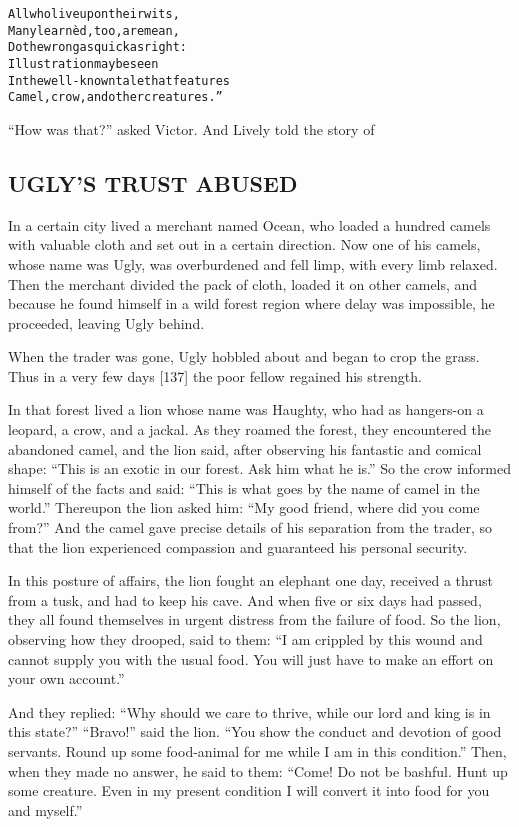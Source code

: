 \documentclass{article}
\renewenvironment{verbatim}{\begin{alltt}\normalfont\begin{centering}}{\end{centering}\end{alltt}}
\begin{document}
\begin{verbatim}
All who live upon their wits,
    Many learnèd, too, are mean,
Do the wrong as quick as right:
    Illustration may be seen
In the well-known tale that features
Camel, crow, and other creatures.”
\end{verbatim}
``How was that?'' asked Victor. And Lively told the story of

\subsection{UGLY'S TRUST ABUSED}

In a certain city lived a merchant named Ocean, who loaded a
hundred camels with valuable cloth and set out in a certain
direction. Now one of his camels, whose name was Ugly, was
overburdened and fell limp, with every limb relaxed. Then the
merchant divided the pack of cloth, loaded it on other camels, and
because he found himself in a wild forest region where delay was
impossible, he proceeded, leaving Ugly behind.

When the trader was gone, Ugly hobbled about and began to crop the
grass. Thus in a very few days [137] the poor fellow regained his
strength.

In that forest lived a lion whose name was Haughty, who had as
hangers-on a leopard, a crow, and a jackal. As they roamed the
forest, they encountered the abandoned camel, and the lion said,
after observing his fantastic and comical shape:
``This is an exotic in our forest. Ask him what he is.'' So the
crow informed himself of the facts and said:
``This is what goes by the name of camel in the world.'' Thereupon
the lion asked him: ``My good friend, where did you come from?''
And the camel gave precise details of his separation from the
trader, so that the lion experienced compassion and guaranteed his
personal security.

In this posture of affairs, the lion fought an elephant one day,
received a thrust from a tusk, and had to keep his cave. And when
five or six days had passed, they all found themselves in urgent
distress from the failure of food. So the lion, observing how they
drooped, said to them:
``I am crippled by this wound and cannot supply you with the usual food. You will just have to make an effort on your own account.''

And they replied:
``Why should we care to thrive, while our lord and king is in this state?''
``Bravo!'' said the lion.
``You show the conduct and devotion of good servants. Round up some food-animal for me while I am in this condition.''
Then, when they made no answer, he said to them:
``Come! Do not be bashful. Hunt up some creature. Even in my present condition I will convert it into food for you and myself.''
\end{document}
